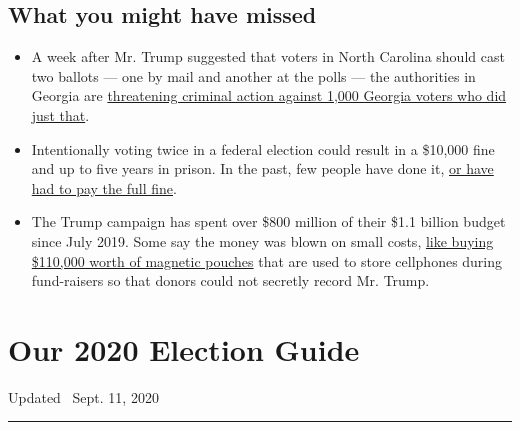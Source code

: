 \hypertarget{what-you-might-have-missed}{%
\subsection{What you might have
missed}\label{what-you-might-have-missed}}

\begin{itemize}
\item
  A week after Mr. Trump suggested that voters in North Carolina should
  cast two ballots --- one by mail and another at the polls --- the
  authorities in Georgia are
  \href{https://www.nytimes3xbfgragh.onion/2020/09/08/us/politics/georgia-double-voting.html}{threatening
  criminal action against 1,000 Georgia voters who did just that}.
\item
  Intentionally voting twice in a federal election could result in a
  \$10,000 fine and up to five years in prison. In the past, few people
  have done it,
  \href{https://www.nytimes3xbfgragh.onion/article/voting-twice.html}{or
  have had to pay the full fine}.
\item
  The Trump campaign has spent over \$800 million of their \$1.1 billion
  budget since July 2019. Some say the money was blown on small costs,
  \href{https://www.nytimes3xbfgragh.onion/2020/09/07/us/politics/trump-election-campaign-fundraising.html}{like
  buying \$110,000 worth of magnetic pouches} that are used to store
  cellphones during fund-raisers so that donors could not secretly
  record Mr. Trump.
\end{itemize}

\hypertarget{our-2020-election-guide}{%
\section{Our 2020 Election Guide}\label{our-2020-election-guide}}

Updated ~Sept. 11, 2020

\begin{center}\rule{0.5\linewidth}{\linethickness}\end{center}

